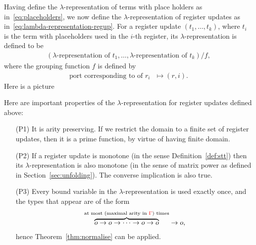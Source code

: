 Having define the $\lambda$-representation of terms with place holders as in~\eqref{eq:placeholders}, we now define the $\lambda$-representation of register updates as in~\eqref{eq:lambda-representation-regup}. For a register update $(t_1,\ldots,t_k)$, where $t_i$ is the term with placeholders used in the $i$-th register,  its $\lambda$-representation is defined to be 
\begin{align*}
(\text{$\lambda$-representation of $t_1$},\ldots,\text{$\lambda$-representation of $t_k$})/f ,
\end{align*}
 where the grouping function $f$ is defined by
 \begin{align*}
 \text{port corresponding to  of $r_i$ } \mapsto (r,i).
 \end{align*}
Here is a picture


Here are important properties of the $\lambda$-representation for register updates defined above:
\begin{enumerate}
\item[(P1)] It is  arity preserving. If we restrict the domain to a finite set of register updates, then it is a prime function, by virtue of having finite domain.
\item[(P2)] If a register update is monotone  (in the sense Definition~\ref{def:stt})  then  its $\lambda$-representation is also monotone (in the sense of matrix power as defined in  Section~\ref{sec:unfolding}). The converse implication is also true. 
\item[(P3)] Every bound variable in the $\lambda$-representation is used exactly once, and the types that appear are of the form 
\begin{align*}
\overbrace{o \to o \to \cdots \to o \to o}^{\text{at most (maximal arity in ${\color{red}{\Gamma}}$) times}} \to o,
\end{align*}
hence Theorem~\ref{thm:normalise} can be applied.
\end{enumerate}

